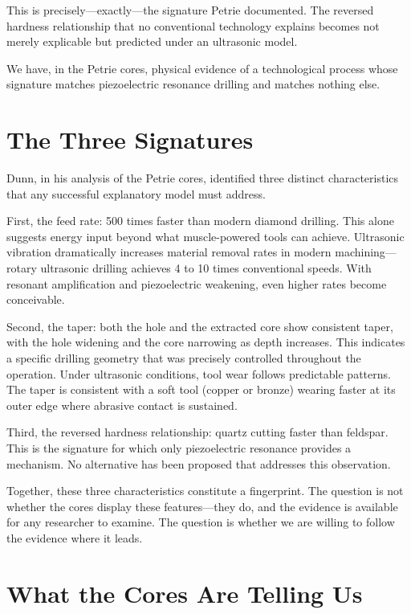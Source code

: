 \documentclass[11pt]{article}
\begin{document}
This is precisely---exactly---the signature Petrie documented. The reversed hardness relationship that no conventional technology explains becomes not merely explicable but predicted under an ultrasonic model.

We have, in the Petrie cores, physical evidence of a technological process whose signature matches piezoelectric resonance drilling and matches nothing else.

\section{The Three Signatures}

Dunn, in his analysis of the Petrie cores, identified three distinct characteristics that any successful explanatory model must address.

First, the feed rate: 500 times faster than modern diamond drilling. This alone suggests energy input beyond what muscle-powered tools can achieve. Ultrasonic vibration dramatically increases material removal rates in modern machining---rotary ultrasonic drilling achieves 4 to 10 times conventional speeds. With resonant amplification and piezoelectric weakening, even higher rates become conceivable.

Second, the taper: both the hole and the extracted core show consistent taper, with the hole widening and the core narrowing as depth increases. This indicates a specific drilling geometry that was precisely controlled throughout the operation. Under ultrasonic conditions, tool wear follows predictable patterns. The taper is consistent with a soft tool (copper or bronze) wearing faster at its outer edge where abrasive contact is sustained.

Third, the reversed hardness relationship: quartz cutting faster than feldspar. This is the signature for which only piezoelectric resonance provides a mechanism. No alternative has been proposed that addresses this observation.

Together, these three characteristics constitute a fingerprint. The question is not whether the cores display these features---they do, and the evidence is available for any researcher to examine. The question is whether we are willing to follow the evidence where it leads.

\section{What the Cores Are Telling Us}
\end{document}
